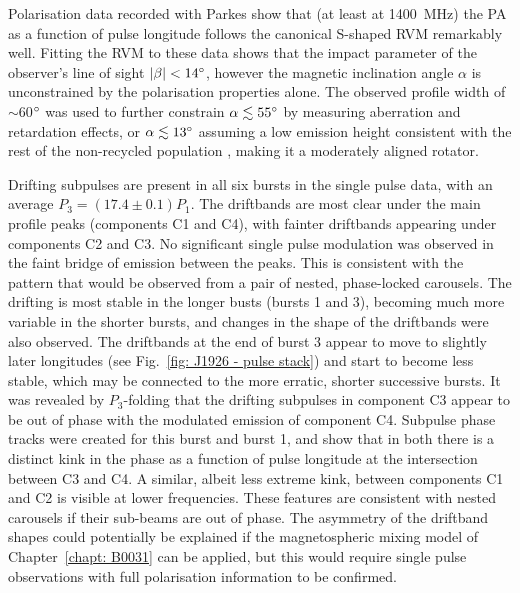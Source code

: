 Polarisation data recorded with Parkes show that (at least at 1400~MHz) the PA as a function of pulse longitude follows the canonical S-shaped RVM remarkably well. Fitting the RVM to these data shows that the impact parameter of the observer's line of sight $|\beta| < 14^\circ$, however the magnetic inclination angle $\alpha$ is unconstrained by the polarisation properties alone. The observed profile width of $\sim$60$^\circ$ was used to further constrain $\alpha \lesssim 55^\circ$ by measuring aberration and retardation effects, or $\alpha \lesssim 13^\circ$ assuming a low emission height consistent with the rest of the non-recycled population \citep{JKxx2019}, making it a moderately aligned rotator.

Drifting subpulses are present in all six bursts in the single pulse data, with an average $P_3 = (17.4\pm 0.1) P_1$. The driftbands are most clear under the main profile peaks (components C1 and C4), with fainter driftbands appearing under components C2 and C3. No significant single pulse modulation was observed in the faint bridge of emission between the peaks. This is consistent with the pattern that would be observed from a pair of nested, phase-locked carousels. The drifting is most stable in the longer busts (bursts 1 and 3), becoming much more variable in the shorter bursts, and changes in the shape of the driftbands were also observed. 
The driftbands at the end of burst 3 appear to move to slightly later longitudes (see Fig.~\ref{fig: J1926 - pulse stack}) and start to become less stable, which may be connected to the more erratic, shorter successive bursts.
It was revealed by $P_3$-folding that the drifting subpulses in component C3 appear to be out of phase with the modulated emission of component C4. Subpulse phase tracks were created for this burst and burst 1, and show that in both there is a distinct kink in the phase as a function of pulse longitude at the intersection between C3 and C4. A similar, albeit less extreme kink, between components C1 and C2 is visible at lower frequencies. These features are consistent with nested carousels if their sub-beams are out of phase. The asymmetry of the driftband shapes could potentially be explained if the magnetospheric mixing model of Chapter~\ref{chapt: B0031} can be applied, but this would require single pulse observations with full polarisation information to be confirmed.

